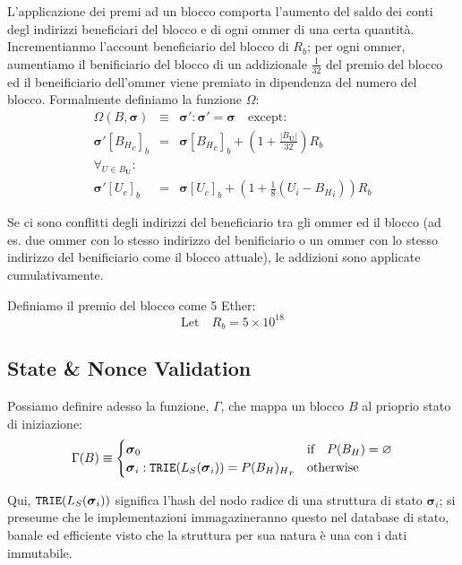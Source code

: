 \documentclass[9pt,oneside]{amsart}
\begin{document}
\begin{multicols}{2}
L'applicazione dei premi ad un blocco comporta l'aumento del saldo dei conti degl indirizzi beneficiari del blocco e di ogni ommer di una certa quantità. Incrementianmo l'account beneficiario del blocco di $R_b$; per ogni ommer, aumentiamo il benificiario del blocco di un addizionale $\frac{1}{32}$ del premio del blocco ed il beneificiario dell'ommer viene premiato in dipendenza del numero del blocco. Formalmente definiamo la funzione $\Omega$:
\begin{eqnarray}
\Omega(B, \boldsymbol{\sigma}) & \equiv & \boldsymbol{\sigma}': \boldsymbol{\sigma}' = \boldsymbol{\sigma} \quad \text{except:} \\
\boldsymbol{\sigma}'[{B_H}_c]_b & = & \boldsymbol{\sigma}[{B_H}_c]_b + (1 + \frac{|B_\mathbf{U}|}{32})R_b \\
\forall_{U \in B_\mathbf{U}}: \\ \nonumber
 \boldsymbol{\sigma}'[U_c]_b & = & \boldsymbol{\sigma}[U_c]_b + (1 + \frac{1}{8} (U_i - {B_H}_i)) R_b 
\end{eqnarray}

Se ci sono conflitti degli indirizzi del beneficiario tra gli ommer ed il blocco (ad es. due ommer con lo stesso indirizzo del benificiario o un ommer con lo stesso indirizzo del benificiario come il blocco attuale), le addizioni sono applicate cumulativamente.

Definiamo il premio del blocco come 5 Ether:
\begin{equation}
\text{Let} \quad R_b = 5 \times 10^{18}
\end{equation}

\subsection{State \& Nonce Validation}\label{sec:statenoncevalidation}

Possiamo definire adesso la funzione, $\Gamma$, che mappa un blocco $B$ al prioprio stato di iniziazione:
\begin{equation}
\Gamma(B) \equiv \begin{cases}
\boldsymbol{\sigma}_0 & \text{if} \quad P(B_H) = \varnothing \\
\boldsymbol{\sigma}_i: \mathtt{\small TRIE}(L_S(\boldsymbol{\sigma}_i)) = {P(B_H)_H}_r & \text{otherwise}
\end{cases}
\end{equation}

Qui, $\mathtt{\small TRIE}(L_S(\boldsymbol{\sigma}_i))$ significa l'hash del nodo radice di una struttura di stato $\boldsymbol{\sigma}_i$; si preseume che le implementazioni immagazineranno questo nel database di stato, banale ed efficiente visto che la struttura per sua natura è una con i dati immutabile.


\end{multicols}
\end{document}
